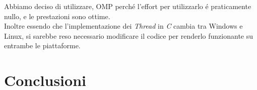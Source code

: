 \documentclass{beamer}
\begin{document}
\begin{frame}
Abbiamo deciso di utilizzare, OMP perch\'e l'effort per utilizzarlo \'e praticamente nullo, e le prestazioni sono ottime.\\
\medskip
Inoltre essendo che l'implementazione dei \textit{Thread} in \textit{C} cambia tra Windows e Linux, si sarebbe reso necessario modificare il codice per renderlo funzionante su entrambe le piattaforme.
\end{frame}

\section{Conclusioni}
\begin{frame}
\end{frame}
\end{document}
